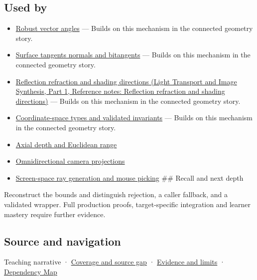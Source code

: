 \subsection{Used by}\label{appendix-f744e41b95b4-used-by}

\hypertarget{appendix-f744e41b95b4-used-by}{}

\begin{itemize}
\item
  \hyperref[appendix-e569e60e18e6]{Robust vector angles} --- Builds on this mechanism in the connected geometry story.
\item
  \hyperref[appendix-e31893dec985]{Surface tangents normals and bitangents} --- Builds on this mechanism in the connected geometry story.
\item
  \href{../04-Light-Transport-and-Image-Synthesis-P01/main.pdf\#nameddest=appendix-44e00863b4d5}{Reflection refraction and shading directions (Light Transport and Image Synthesis, Part 1, Reference notes: Reflection refraction and shading directions)} --- Builds on this mechanism in the connected geometry story.
\item
  \hyperref[appendix-380a220e2529]{Coordinate-space types and validated invariants} --- Builds on this mechanism in the connected geometry story.
\item
  \hyperref[appendix-cac01ebeeb11]{Axial depth and Euclidean range}
\item
  \hyperref[appendix-fc99ad39f351]{Omnidirectional camera projections}
\item
  \hyperref[appendix-f1a6d43e80d1]{Screen-space ray generation and mouse picking} \#\# Recall and next depth
\end{itemize}

Reconstruct the bounds and distinguish rejection, a caller fallback, and a validated wrapper. Full production proofs, target-specific integration and learner mastery require further evidence.

\subsection{Source and navigation}\label{appendix-f744e41b95b4-source-and-navigation}

\hypertarget{appendix-f744e41b95b4-source-and-navigation}{}

{Teaching narrative} · \hyperref[appendix-fd090d982a15-phase-6---parts-501-600]{Coverage and source gap} · \hyperref[appendix-a103e7846d21-phase-6---source-analysis-and-verification]{Evidence and limits} · \hyperref[appendix-4ad47bdd269a]{Dependency Map}
